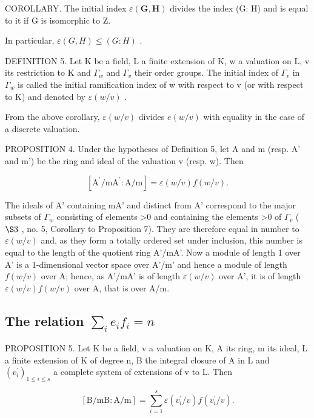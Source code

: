 COROLLARY. The initial index \(\varepsilon(\mathbf{G},\mathbf{H})\) divides the index (G: H) and is equal to it if G is isomorphic to Z.

In particular, \(\varepsilon(G, H) \leqslant (G: H)\) .

DEFINITION 5. Let K be a field, L a finite extension of K, w a valuation on L, v its restriction to K and \(\Gamma_{w}\) and \(\Gamma_{v}\) their order groups. The initial index of \(\Gamma_{v}\) in \(\Gamma_{w}\) is called the initial ramification index of w with respect to v (or with respect to K) and denoted by \(\varepsilon(w/v)\) .

From the above corollary, \(\varepsilon(w/v)\) divides \(e(w/v)\) with equality in the case of a discrete valuation.

PROPOSITION 4. Under the hypotheses of Definition 5, let A and m (resp. A' and m') be the ring and ideal of the valuation v (resp. w). Then

\[
[ \mathrm{A} ^ {\prime} / \mathrm{mA} ^ {\prime}: \mathrm{A} / \mathrm{m} ] = \varepsilon (w / v) f (w / v).
\]

The ideals of A' containing mA' and distinct from A' correspond to the major subsets of \(\Gamma_{w}\) consisting of elements \textgreater0 and containing the elements \textgreater0 of \(\Gamma_{v}\) ( \(\S3\) , no. 5, Corollary to Proposition 7). They are therefore equal in number to \(\varepsilon(w/v)\) and, as they form a totally ordered set under inclusion, this number is equal to the length of the quotient ring A'/mA'. Now a module of length 1 over A' is a 1-dimensional vector space over A'/m' and hence a module of length \(f(w/v)\) over A; hence, as A'/mA' is of length \(\varepsilon(w/v)\) over A', it is of length \(\varepsilon(w/v)f(w/v)\) over A, that is over A/m.

\subsection{\texorpdfstring{The relation \(\sum_{i} e_{i} f_{i} = n\)}{The relation Σ ei fi = n}}

PROPOSITION 5. Let K be a field, v a valuation on K, A its ring, m its ideal, L a finite extension of K of degree n, B the integral closure of A in L and \((v_{i}^{\prime})_{1 \leq i \leq s}\) a complete system of extensions of v to L. Then

\[
[ \mathrm{B} / \mathrm{mB}: \mathrm{A} / \mathrm{m} ] = \sum_ {i = 1} ^ {s} \varepsilon (v _ {i} ^ {\prime} / v) f (v _ {i} ^ {\prime} / v).
\]

